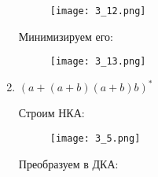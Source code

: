 \documentclass[12pt, a4paper]{article}
\begin{document}
\begin{enumerate}
    \begin{figure}[H]
        \centering
        \texttt{[image: 3\_12.png]}
    \end{figure}

Минимизируем его:

\begin{comment}
digraph {
    rankdir="LR"
    "" [shape=point]
    q1 [shape=circle]
    "{q6q8, q2q8, q6}" [shape=doublecircle]
    "q3q7, q5" [shape=circle]
    q4 [shape=circle]

    "" -> q1
    q1 -> "{q6q8, q2q8, q6}"  [label="a"]
    "{q6q8, q2q8, q6}" -> "q3q7, q5" [label="a"]
    "q3q7, q5" -> "{q6q8, q2q8, q6}" [label="b"]
    "q3q7, q5" -> q4 [label="a"]
    q4 -> "q3q7, q5" [label="b"]
}
\end{comment}

    \begin{figure}[H]
        \centering
        \texttt{[image: 3\_13.png]}
    \end{figure}


    \item \((a+(a+b)(a+b)b)^*\)
    
\begin{comment}
digraph {
    rankdir="LR"
    "" [shape=point]
    q1 [shape=doublecircle]
    q2 [shape=circle]
    q3 [shape=circle]

    "" -> q1
    q1 -> q1 [label="a"]
    q1 -> q2 [label="a,b"]
    q2 -> q3 [label="a,b"]
    q3 -> q1 [label="b"]
}
\end{comment}

Строим НКА:

    \begin{figure}[H]
        \centering
        \texttt{[image: 3\_5.png]}
    \end{figure}
    
Преобразуем в ДКА:

\begin{comment}
digraph {
    rankdir="LR"
    "" [shape=point]
    q1 [shape=doublecircle]
    "{q1q2}" [shape=doublecircle]
    q2 [shape=circle]
    "{q1,q2,q3}" [shape=doublecircle]
    "{q2,q3}" [shape=circle]
    "{q1q3}" [shape=doublecircle]
    q3 [shape=circle]

    "" -> q1
    q1 -> "{q1q2}" [label="a"]
    q1 -> q2 [label="b"]
    "{q1q2}" -> "{q1,q2,q3}" [label="a"]
    "{q1,q2,q3}" -> "{q1,q2,q3}" [label="a,b"]
    "{q1q2}" -> "{q2,q3}" [label="b"]
    "{q2,q3}" -> "{q1q3}" [label="b"]
    "{q2,q3}" -> q3 [label="a"]
    "{q1q3}" -> "{q1q2}" [label="a,b"]
    q2 -> q3 [label="a,b"]
    q3 -> q1 [label="b"]
}
\end{comment}


\end{enumerate}
\end{document}
